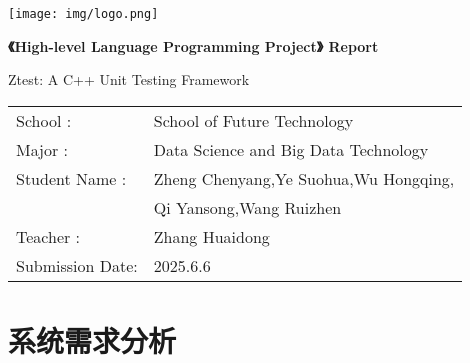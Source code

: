 \documentclass{article}
\begin{document}
\begin{titlepage}
    \centering
    \vspace*{1cm}

    \texttt{[image: img/logo.png]} %

    \fontsize{24pt}{32pt}\selectfont
    \textbf{《High-level Language Programming Project》 Report}
    \vspace{4cm}

    \centering
    Ztest: A C++ Unit Testing Framework
    \vspace{2cm}

    \fontsize{16pt}{16pt}\selectfont
    \begin{tabular}{ll}                                                                \\
        School       :   & School of Future Technology\hspace{6cm}          \\
        Major        :   & Data Science and Big Data Technology\hspace{6cm} \\
        Student Name :   & Zheng Chenyang,Ye Suohua,Wu Hongqing,            \\
                         & Qi Yansong,Wang Ruizhen                          \\
        Teacher      :   & Zhang Huaidong\hspace{6cm}                       \\
        Submission Date: & 2025.6.6\hspace{6cm}                             \\
    \end{tabular}

    \vfill

    \vspace{1cm}
\end{titlepage}

\tableofcontents  %
\newpage
\section{系统需求分析}
\end{document}
